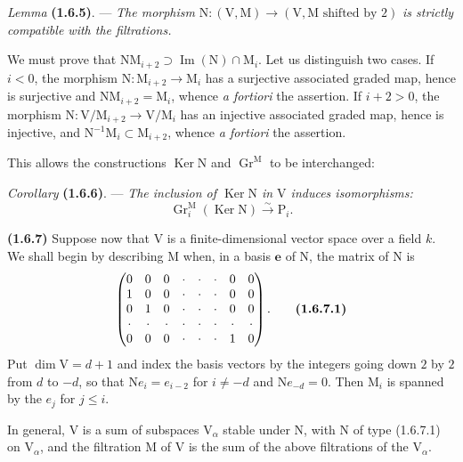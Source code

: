 \documentclass[11pt,leqno]{article}
\begin{document}
\textit{Lemma} \textbf{(1.6.5)}. — \textit{The morphism} \(\mathrm{N}:(\mathrm{V},\mathrm{M})\to(\mathrm{V},\mathrm{M}\text{ shifted by }2)\) \textit{is strictly compatible with the filtrations.}

We must prove that \(\mathrm{N}\mathrm{M}_{i+2}\supset\operatorname{Im}(\mathrm{N})\cap\mathrm{M}_i\). Let us distinguish two cases. If \(i<0\), the morphism \(\mathrm{N}:\mathrm{M}_{i+2}\to\mathrm{M}_i\) has a surjective associated graded map, hence is surjective and \(\mathrm{N}\mathrm{M}_{i+2}=\mathrm{M}_i\), whence \textit{a fortiori} the assertion. If \(i+2>0\), the morphism \(\mathrm{N}:\mathrm{V}/\mathrm{M}_{i+2}\to\mathrm{V}/\mathrm{M}_i\) has an injective associated graded map, hence is injective, and \(\mathrm{N}^{-1}\mathrm{M}_i\subset\mathrm{M}_{i+2}\), whence \textit{a fortiori} the assertion.

This allows the constructions \(\operatorname{Ker}\mathrm{N}\) and \(\operatorname{Gr}^{\mathrm{M}}\) to be interchanged:

\textit{Corollary} \textbf{(1.6.6)}. — \textit{The inclusion of \(\operatorname{Ker}\mathrm{N}\) in \(\mathrm{V}\) induces isomorphisms:}
\[
\operatorname{Gr}_i^{\mathrm{M}}(\operatorname{Ker}\mathrm{N})
\xrightarrow{\sim}\mathrm{P}_i.
\]

\textbf{(1.6.7)} Suppose now that \(\mathrm{V}\) is a finite-dimensional vector space over a field \(k\). We shall begin by describing \(\mathrm{M}\) when, in a basis \(\mathbf{e}\) of \(\mathrm{N}\), the matrix of \(\mathrm{N}\) is
\[
\begin{pmatrix}
0 & 0 & 0 & \cdot & \cdot & \cdot & 0 & 0\\
1 & 0 & 0 & \cdot & \cdot & \cdot & 0 & 0\\
0 & 1 & 0 & \cdot & \cdot & \cdot & 0 & 0\\
\cdot & \cdot & \cdot & \cdot & \cdot & \cdot & \cdot & \cdot\\
0 & 0 & 0 & \cdot & \cdot & \cdot & 1 & 0
\end{pmatrix}.
\tag*{\textbf{(1.6.7.1)}}
\]
Put \(\dim\mathrm{V}=d+1\) and index the basis vectors by the integers going down \(2\) by \(2\) from \(d\) to \(-d\), so that \(\mathrm{N}e_i=e_{i-2}\) for  \(i\ne -d\) and \(\mathrm{N}e_{-d}=0\). Then \(\mathrm{M}_i\) is spanned by the \(e_j\) for \(j\le i\).

In general, \(\mathrm{V}\) is a sum of subspaces \(\mathrm{V}_\alpha\) stable under \(\mathrm{N}\), with \(\mathrm{N}\) of type (1.6.7.1) on \(\mathrm{V}_\alpha\), and the filtration \(\mathrm{M}\) of \(\mathrm{V}\) is the sum of the above filtrations of the \(\mathrm{V}_\alpha\).
\end{document}

